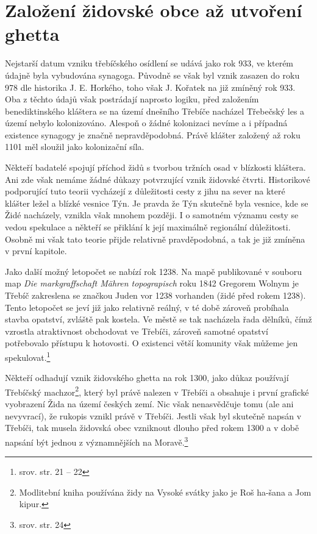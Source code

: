 \documentclass[a4paper,oneside,12pt]{report}
\begin{document}
\section{Založení židovské obce až utvoření ghetta}

Nejstarší datum vzniku třebíčského osídlení se udává jako rok 933, ve kterém údajně byla vybudována synagoga.
Původně se však byl vznik zasazen do roku 978 dle historika J. E. Horkého, toho však J. Kořatek  na již zmíněný rok 933.
Oba z těchto údajů však postrádají naprosto logiku, před založením benediktinského kláštera se na území dnešního Třebíče nacházel Třebečský les a území nebylo kolonizováno.
Alespoň o žádné kolonizaci nevíme a i případná existence synagogy je značně nepravděpodobná.
Právě klášter založený až roku 1101 měl sloužil jako kolonizační síla.

Někteří badatelé spojují příchod židů s tvorbou tržních osad v blízkosti kláštera.
Ani zde však nemáme žádné důkazy potvrzující vznik židovské čtvrti.
Historikové podporující tuto teorii vycházejí z důležitosti cesty z jihu na sever na které klášter ležel a blízké vesnice Týn.
Je pravda že Týn skutečně byla vesnice, kde se Židé nacházely, vznikla však mnohem později.
I o samotném významu cesty se vedou spekulace a někteří se přiklání k její maximálně regionální důležitosti.
Osobně mi však tato teorie přijde relativně pravděpodobná, a tak je již zmíněna v první kapitole.

Jako další možný letopočet se nabízí rok 1238.
Na mapě publikované v souboru map \textit{Die markgraffschaft Mähren topograpisch} roku 1842 Gregorem Wolnym je Třebíč zakreslena se značkou Juden vor 1238 vorhanden (židé před rokem 1238).
Tento letopočet se jeví již jako relativně reálný, v té době zároveň probíhala stavba opatství, zvláště pak kostela.
Ve městě se tak nacházela řada dělníků, čímž vzrostla atraktivnost obchodovat ve Třebíči, zároveň samotné opatství potřebovalo přístupu k hotovosti.
O existenci větší komunity však můžeme jen spekulovat.\footnote{srov. \cite{Fiser2005} str. 21 -- 22}

Někteří odhadují vznik židovského ghetta na rok 1300, jako důkaz používají Třebíčský machzor\footnote{Modlitební kniha používána židy na Vysoké svátky jako je Roš ha-šana a Jom kipur.}, který byl právě nalezen v Třebíči a obsahuje i první grafické vyobrazení Žida na území českých zemí.
Nic však nenasvědčuje tomu (ale ani nevyvrací), že rukopis vznikl právě v Třebíči.
Jestli však byl skutečně napsán v Třebíči, tak musela židovská obec vzniknout dlouho před rokem 1300 a v době napsání být jednou z významnějších na Moravě.\footnote{srov.  str. 24}
\end{document}
